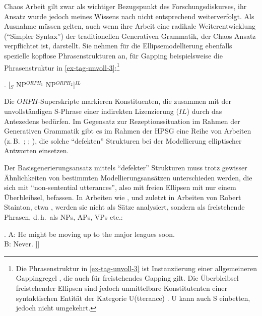 Chaos Arbeit gilt zwar als wichtiger Bezugspunkt des Forschungsdiskurses, ihr Ansatz wurde jedoch meines Wissens nach nicht entsprechend weiterverfolgt. Als Ausnahme müssen \cite{Culicover:Jackendoff:05} gelten, auch wenn ihre Arbeit eine radikale Weiterentwicklung ("`Simpler Syntax"') der traditionellen Generativen Grammatik, der Chaos Ansatz verpflichtet ist, darstellt. Sie nehmen für die Ellipsemodellierung ebenfalls spezielle kopflose Phrasenstrukturen an, für Gapping beispielsweise die Phrasenstruktur in \ref{ex-tag-unvoll-3}:\footnote{Die Phrasenstruktur in \ref{ex-tag-unvoll-3} ist Instanziierung einer allgemeineren Gappingregel \citep[276]{Culicover:Jackendoff:05}, die auch für freistehendes Gapping gilt. Die Überbleibsel freistehender Ellipsen sind jedoch unmittelbare Konstitutenten einer syntaktischen Entität der Kategorie U(tterance) \citep[237f]{Culicover:Jackendoff:05}. U kann auch S einbetten, jedoch nicht umgekehrt.}

\ex. \label{ex-tag-unvoll-3}[$_S$ NP$^{ORPH_1}$ NP$^{ORPH_2}$]$^{IL}$ \hfill \citep[277]{Culicover:Jackendoff:05}

Die $ORPH$-Superskripte markieren Konstituenten, die zusammen mit der unvollständigen S-Phrase einer indirekten Lizenzierung ($IL$) durch das Antezedens bedürfen. Im Gegensatz zur Rezeptionssituation im Rahmen der Generativen Grammatik gibt es im Rahmen der HPSG eine Reihe von Arbeiten (z.\,B.\ \citealt{Ginzburg:Sag:01}; \citealt[333f]{Ginzburg:Cooper:04}; \citealt[171ff]{Schlangen:03}), die solche "`defekten"' Strukturen bei der Modellierung elliptischer Antworten einsetzen. 

Der Basisgenerierungsansatz mittels "`defekter"' Strukturen muss trotz gewisser Ähnlichkeiten von bestimmten Modellierungsansätzen unterschieden werden, die sich mit "`non-senten\-tial utterances"', also mit freien Ellipsen mit nur einem Überbleibsel, befassen. In Arbeiten wie \cite{Yanofsky:78}, \cite{Barton:90} und zuletzt in Arbeiten von Robert Stainton, etwa \cite{Stainton:98,Stainton:06}, werden sie nicht als Sätze analysiert, sondern als freistehende Phrasen, d.\,h.\ als NPs, APs, VPs etc.:

\ex. \label{ex-freistehende-phrasen}
A: He might be moving up to the major leagues soon. \\
B: Never. \newline
[$_{ADV''}$ [$_{ADV'}$ [$_{ADV}$ never]]] \\
\citep[60]{Barton:90}
 
